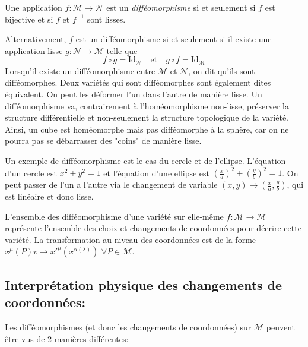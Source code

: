 \begin{theoremframe}
    \begin{defi}
        Une application $f:\mathcal{M} \to \mathcal{N}$ est un \emph{difféomorphisme} si et seulement si $f$ est bijective et si $f$ et $f^{-1}$ sont lisses. 
    \end{defi}
\end{theoremframe}
Alternativement, $f$ est un difféomorphisme si et seulement si il existe une application lisse $g: \mathcal{N} \to \mathcal{M}$ telle que 
\begin{equation}
    f \circ g = \mathrm{Id}_\mathcal{N} \quad \text{et} \quad g \circ f = \mathrm{Id}_\mathcal{M}
\end{equation}
Lorsqu'il existe un difféomorphisme entre $\mathcal{M}$ et $\mathcal{N}$, on dit qu'ils sont difféomorphes. Deux variétés qui sont difféomorphes sont également dites équivalent. On peut les déformer l'un dans l'autre de manière lisse. Un difféomorphisme va, contrairement à l'homéomorphisme non-lisse, préserver la structure différentielle et non-seulement la structure topologique de la variété. Ainsi, un cube est homéomorphe mais pas difféomorphe à la sphère, car on ne pourra pas se débarrasser des "coins" de manière lisse.

Un exemple de difféomorphisme est le cas du cercle et de l'ellipse. 
L'équation d'un cercle est $x^2 + y^{2 } = 1$ et l'équation d'une ellipse est $(\frac{x}{a})^2 +(\frac{y}{b})^2 = 1 $. On peut passer de l'un a l'autre via le changement de variable $(x, y) \to (\frac{x}{a}, \frac{y}{b})$, qui est linéaire et donc lisse. 

L'ensemble des difféomorphisme d'une variété sur elle-même $f: \mathcal{M} \to \mathcal{M}$ représente l'ensemble des choix et changements de coordonnées pour décrire cette variété. La transformation au niveau des coordonnées est de la forme $x^{\mu}(P)v \to x'^{\mu}(x^{\alpha(\lambda)})$ $\forall P \in \mathcal{M}$. 

\subsection{Interprétation physique des changements de coordonnées:}

Les difféomorphismes (et donc les changements de coordonnées) sur $\mathcal{M}$ peuvent être vus de 2 manières différentes:

